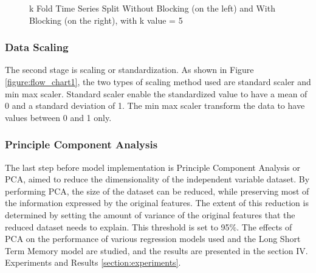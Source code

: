 \documentclass[conference]{IEEEtran}
\begin{document}
\begin{figure}
	\hfill
	\hfill
	\hfill
	\caption{k Fold Time Series Split Without Blocking (on the left) and With Blocking (on the right), with k value = 5}
	\label{figure:k_fold_blocking_no_blocking}
\end{figure}

\subsubsection{Data Scaling}
The second stage is scaling or standardization. As shown in Figure \ref{figure:flow_chart1}, the two types of scaling method used are standard scaler and min max scaler. Standard scaler enable the standardized value to have a mean of 0 and a standard deviation of 1. The min max scaler transform the data to have values between 0 and 1 only.

\subsubsection{Principle Component Analysis}
The last step before model implementation is Principle Component Analysis or PCA, aimed to reduce the dimensionality of the independent variable dataset. By performing PCA, the size of the dataset can be reduced, while preserving most of the information expressed by the original features. The extent of this reduction is determined by setting the amount of variance of the original features that the reduced dataset needs to explain. This threshold is set to 95$\%$. The effects of PCA on the performance of various regression models used and the Long Short Term Memory model are studied, and the results are presented in the section IV. Experiments and Results \ref{section:experiments}.
\end{document}
